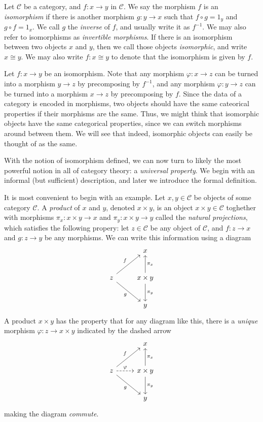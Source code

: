 \documentclass[11pt, A4]{article}
\begin{document}
\begin{definition}\label{4.1}
	Let $\mathcal{C} $ be a category, and $f : x \to y$ in $\mathcal{C} $. We say the morphism $f$ is an \emph{isomorphism} if there is another morphism $g : y \to x$ such that $f\circ g=1_y$ and $g\circ f=1_x$. We call $g$ the \emph{inverse} of $f$, and usually write it as $f^{-1} $. We may also refer to isomorphisms as \emph{invertible morphisms}. If there is an isomorphism between two objects $x$ and $y$, then we call those objects \emph{isomorphic}, and write $x \cong y$. We may also write $f : x \cong y$ to denote that the isomorphism is given by $f$.
\end{definition}

Let $f : x \to y$ be an isomorphism. Note that any morphism $\varphi : x \to z$ can be turned into a morphism $y\to z$ by precomposing by $f^{-1} $, and any morphism $\varphi : y \to z$ can be turned into a morphism $x\to z$ by precomposing by $f$. Since the data of a category is encoded in morphisms, two objects should have the same cateorical properties if their morphisms are the same. Thus, we might think that isomorphic objects have the same categorical properties, since we can switch morphisms around between them. We will see that indeed, isomorphic objects can easily be thought of as the same.

With the notion of isomorphism defined, we can now turn to likely the most powerful notion in all of category theory: a \emph{universal property}. We begin with an informal (but sufficient) description, and later we introduce the formal definition.

It is most convenient to begin with an example. Let $x,y\in \mathcal{C} $ be objects of some category $\mathcal{C} $. A \emph{product} of $x$ and $y$, denoted $x\times y$, is an object $x\times y\in \mathcal{C} $ toghether with morphisms $\pi _x : x\times y \to x$ and $\pi _y : x\times y \to y$ called the \emph{natural projections}, which satisfies the following propery: let $z\in \mathcal{C} $ be any object of $\mathcal{C} $, and $f : z \to x$ and $g : z \to y$ be any morphisms. We can write this information using a diagram
\[\begin{tikzcd}[row sep = 2.5em, column sep = 2.5em]
 & x \\
z \ar[" f ", ur] \ar[" g "', dr]  & x\times y \ar[" \pi _x "', u] \ar[" \pi _y ", d]  \\
 & y
\end{tikzcd}\]
A product $x\times y$ has the property that for any diagram like this, there is a \emph{unique} morphism $\varphi : z \to x\times y$ indicated by the dashed arrow
\[\begin{tikzcd}[row sep = 2.5em, column sep = 2.5em]
 & x \\
z \ar[" f ", ur] \ar[" g "', dr] \ar[" \varphi  ", dashed, r]  & x\times y \ar[" \pi _x "', u] \ar[" \pi _y ", d]  \\
 & y
\end{tikzcd}\]
making the diagram \emph{commute}.
\end{document}

